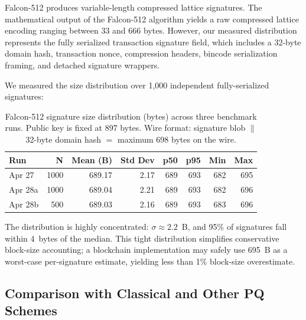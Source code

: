 \documentclass[11pt,a4paper]{article}
\begin{document}
Falcon-512 produces variable-length compressed lattice signatures. The mathematical output of the Falcon-512 algorithm yields a raw compressed lattice encoding ranging between 33 and 666 bytes. However, our measured distribution represents the fully serialized transaction signature field, which includes a 32-byte domain hash, transaction nonce, compression headers, bincode serialization framing, and detached signature wrappers.

We measured the size distribution over 1,000 independent fully-serialized signatures:

\begin{table}[h]
\centering
\small
\begin{tabular}{@{}lrrrrrrr@{}}
\toprule
\textbf{Run} & \textbf{N} & \textbf{Mean (B)} & \textbf{Std Dev} & \textbf{p50} & \textbf{p95} & \textbf{Min} & \textbf{Max} \\
\midrule
Apr 27 & 1000 & 689.17 & 2.17 & 689 & 693 & 682 & 695 \\
Apr 28a & 1000 & 689.04 & 2.21 & 689 & 693 & 682 & 696 \\
Apr 28b & 500  & 689.03 & 2.16 & 689 & 693 & 683 & 696 \\
\bottomrule
\end{tabular}
\caption{Falcon-512 signature size distribution (bytes) across three benchmark runs.
Public key is fixed at 897 bytes. Wire format: signature blob $\|$ 32-byte domain hash
$=$ maximum 698 bytes on the wire.}
\label{tab:sigsize}
\end{table}

The distribution is highly concentrated: $\sigma \approx 2.2$~B, and 95\% of
signatures fall within 4~bytes of the median. This tight distribution
simplifies conservative block-size accounting; a blockchain implementation
may safely use 695~B as a worst-case per-signature estimate, yielding less
than 1\% block-size overestimate.

\subsection{Comparison with Classical and Other PQ Schemes}
\end{document}

